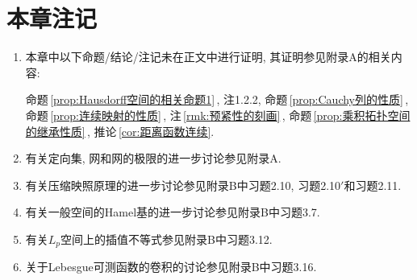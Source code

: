     \section*{本章注记}
    \begin{enumerate}
    \item 本章中以下命题/结论/注记未在正文中进行证明, 其证明参见附录A的相关内容:

        \hspace{4em}命题\,\ref{prop:Hausdorff空间的相关命题1}\,, 注1.2.2, 命题\,\ref{prop:Cauchy列的性质}\,, 命题\,\ref{prop:连续映射的性质}\,, 注\,\ref{rmk:预紧性的刻画}\,, 命题\,\ref{prop:乘积拓扑空间的继承性质}\,, 推论\,\ref{cor:距离函数连续}.
    \item 有关定向集, 网和网的极限的进一步讨论参见附录A.
    \item 有关压缩映照原理的进一步讨论参见附录B中习题2.10, 习题2.10$ ' $和习题2.11.
    \item 有关一般空间的Hamel基的进一步讨论参见附录B中习题3.7.
    \item 有关$ L_p $空间上的插值不等式参见附录B中习题3.12.
    \item 关于Lebesgue可测函数的卷积的讨论参见附录B中习题3.16.
    \end{enumerate}